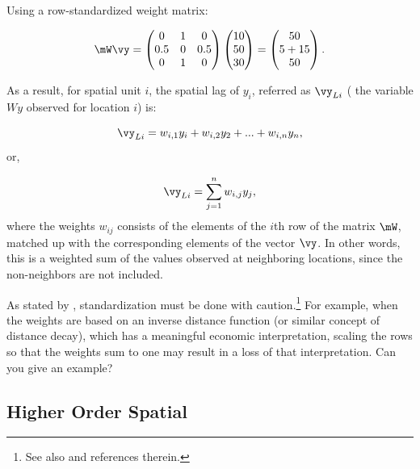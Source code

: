 \documentclass[english,12pt]{book}\usepackage[]{graphicx}\usepackage[]{xcolor}
\begin{document}
Using a row-standardized weight matrix:

\begin{equation*}
  \mW\vy =    \begin{pmatrix}
     0 & 1 & 0 \\
     0.5 & 0 & 0.5 \\
     0 & 1 & 0
  \end{pmatrix}
  \begin{pmatrix}
     10 \\
     50 \\
     30
  \end{pmatrix} =
  \begin{pmatrix}
     50 \\
     5 + 15 \\
     50
  \end{pmatrix}.
\end{equation*}

As a result, for spatial unit $i$, the spatial lag of $y_i$, referred as $\vy_{Li}$ ( the variable $Wy$ observed for location $i$) is:

\begin{equation*}
  \vy_{Li} = w_{i, 1}y_i + w_{i, 2}y_2 + ... + w_{i, n}y_n, 
\end{equation*}
%
or,

\begin{equation*}
  \vy_{Li} = \sum_{j = 1}^nw_{i,j}y_j,
\end{equation*}
%
where the weights $w_{ij}$ consists of the elements of the $i$th row of the matrix $\mW$, matched up with the corresponding elements of the vector $\vy$. In other words, this is a weighted sum of the values observed at neighboring locations, since the non-neighbors are not included. 

\begin{remark}
As stated by \citet[][p. 23-24]{anselin1988spatial}, standardization must be done with caution.\footnote{See also \citet[][p. 12]{elhorst2014spatial} and references therein.} For example, when the weights are based on an inverse distance function (or similar concept of distance decay), which has a meaningful economic interpretation, scaling the rows so that the weights sum to one may result in a loss of that interpretation. Can you give an example?
\end{remark}


\subsection{Higher Order Spatial}\label{sec:HSO}
\end{document}
